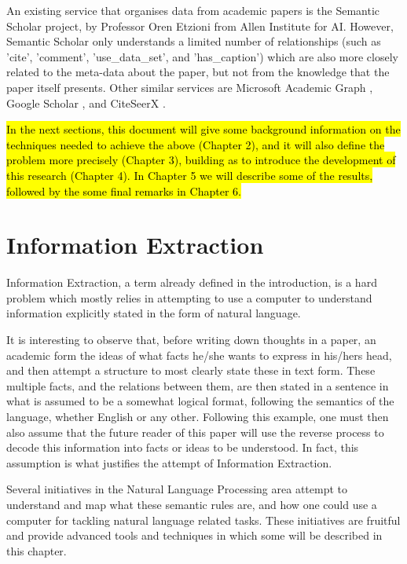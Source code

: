 \documentclass[11pt,a4paper,openright]{memoir}
\begin{document}
An existing service that organises data from academic papers is the Semantic Scholar \cite{semanticscholar} project, by Professor Oren Etzioni from Allen Institute for AI. However, Semantic Scholar only understands a limited number of relationships (such as 'cite', 'comment', 'use\_data\_set', and 'has\_caption') which are also more closely related to the meta-data about the paper, but not from the knowledge that the paper itself presents. Other similar services are Microsoft Academic Graph \cite{microsoft-academic-data}, Google Scholar \cite{google-scholar}, and CiteSeerX \cite{citeseer-x}.

\hl{In the next sections, this document will give some background information on the techniques needed to achieve the above (Chapter 2), and it will also define the problem more precisely (Chapter 3), building as to introduce the development of this research (Chapter 4). In Chapter 5 we will describe some of the results, followed by the some final remarks in Chapter 6.}


%
%
%
%


\chapter{Information Extraction}

Information Extraction, a term already defined in the introduction, is a hard problem which mostly relies in attempting to use a computer to understand information explicitly stated in the form of natural language.

It is interesting to observe that, before writing down thoughts in a paper, an academic form the ideas of what facts he/she wants to express in his/hers head, and then attempt a structure to most clearly state these in text form. These multiple facts, and the relations between them, are then stated in a sentence in what is assumed to be a somewhat logical format, following the semantics of the language, whether English or any other. Following this example, one must then also assume that the future reader of this paper will use the reverse process to decode this information into facts or ideas to be understood. In fact, this assumption is what justifies the attempt of Information Extraction.

Several initiatives in the Natural Language Processing area attempt to understand and map what these semantic rules are, and how one could use a computer for tackling natural language related tasks. These initiatives are fruitful and provide advanced tools and techniques in which some will be described in this chapter.
\end{document}
